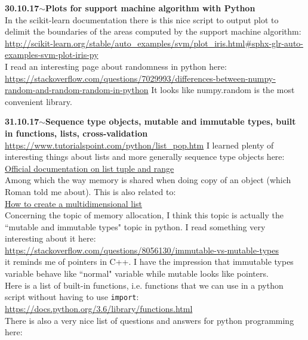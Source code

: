 \documentclass[11pt,a4paper]{article}
\newenvironment{loggentry}[2]%
{\noindent\textbf{#1}\hspace{1cm}$\mathbf{\sim}$\text{ }\textbf{#2}\\}{\vspace{0.5cm}}
\begin{document}
\begin{loggentry}{30.10.17}{Plots for support machine algorithm with Python}
In the scikit-learn documentation there is this nice script to output plot to delimit the boundaries of the areas computed by the support machine algorithm:\\
\url{http://scikit-learn.org/stable/auto_examples/svm/plot_iris.html#sphx-glr-auto-examples-svm-plot-iris-py}\\
I read an interesting page about randomness in python here:\\
\url{https://stackoverflow.com/questions/7029993/differences-between-numpy-random-and-random-random-in-python}
It looks like numpy.random is the most convenient library.
\end{loggentry}

\begin{loggentry}{31.10.17}{Sequence type objects, mutable and immutable types, built in functions, lists, cross-validation}
\url{https://www.tutorialspoint.com/python/list_pop.htm}
I learned plenty of interesting things about lists and more generally sequence type objects here:\\
\href{https://docs.python.org/3.6/library/stdtypes.html?highlight=list#sequence-types-list-tuple-range}{Official documentation on list tuple and range}\\
Among which the way memory is shared when doing copy of an object (which Roman told me about). This is also related to:\\
\href{https://docs.python.org/3.6/faq/programming.html#faq-multidimensional-list}{How to create a multidimensional list}\\
Concerning the topic of memory allocation, I think this topic is actually the ``mutable and immutable types" topic in python. I read something very interesting about it here:\\
\url{https://stackoverflow.com/questions/8056130/immutable-vs-mutable-types}\\
it reminds me of pointers in C++. I have the impression that immutable types variable behave like ``normal" variable while mutable looks like pointers. \\
Here is a list of built-in functions, i.e. functions that we can use in a python script without having to use \texttt{import}:\\
\url{https://docs.python.org/3.6/library/functions.html}\\
There is also a very nice list of questions and answers for python programming here:\\

\end{loggentry}
\end{document}
